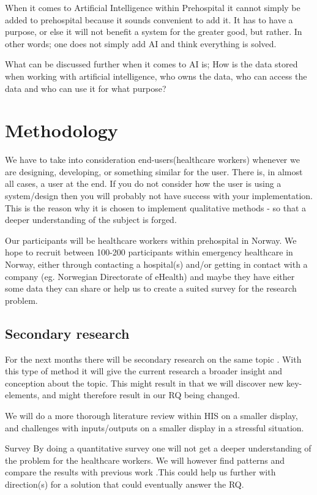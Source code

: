 \documentclass[fleqn,10pt]{wlscirep}
\begin{document}
When it comes to Artificial Intelligence within Prehospital it cannot simply be added to prehospital because it sounds convenient to add it. It has to have a purpose, or else it will not benefit a system for the greater good, but rather\cite{M_Kilde9}. In other words; one does not simply add AI and think everything is solved. 

What can be discussed further when it comes to AI is; How is the data stored when working with artificial intelligence, who owns the data, who can access the data and who can use it for what purpose? \cite{M_Kilde9}

\section{Methodology}
We have to take into consideration end-users(healthcare workers) whenever we are designing, developing, or something similar for the user. There is, in almost all cases, a user at the end. If you do not consider how the user is using a system/design then you will probably not have success with your implementation. \cite{M_Kilde16}\cite{M_Kilde17} This is the reason why it is chosen to implement qualitative methods - so that a deeper understanding of the subject is forged. 

Our participants will be healthcare workers within prehospital in Norway. We hope to recruit between 100-200 participants within emergency healthcare in Norway, either through contacting a hospital(s) and/or getting in contact with a company (eg. Norwegian Directorate of eHealth) and maybe they have either some data they can share or help us to create a suited survey for the research problem. 

\subsection{Secondary research}
For the next months there will be secondary research on the same topic \cite{M_Kilde18}. With this type of method it will give the current research a broader insight and conception about the topic. This might result in that we will discover new key-elements, and might therefore result in our RQ being changed.  

We will do a more thorough literature review within HIS on a smaller display, and challenges with inputs/outputs on a smaller display in a stressful situation.

Survey 
By doing a quantitative survey one will not get a deeper understanding of the problem for the healthcare workers. We will however find patterns and compare the results with previous work \cite{M_Kilde19}.This could help us further with direction(s) for a solution that could eventually answer the RQ. 
\end{document}
